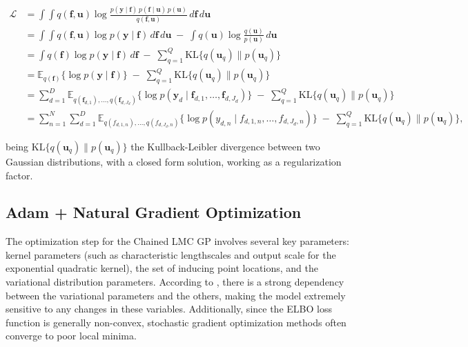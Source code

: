 \begin{equation}
	\begin{split}
		\mathcal{L}
		&= \int\!\!\int q(\boldsymbol{f},\boldsymbol{u})
		\log \frac{p(\boldsymbol{y}\mid\boldsymbol{f})\,
			p(\boldsymbol{f}\mid\boldsymbol{u})\,
			p(\boldsymbol{u})}
		{q(\boldsymbol{f},\boldsymbol{u})}
		\,d\boldsymbol{f}\,d\boldsymbol{u}
		\\
		&= \int\!\!\int q(\boldsymbol{f},\boldsymbol{u})
		\log p(\boldsymbol{y}\mid\boldsymbol{f})
		\,d\boldsymbol{f}\,d\boldsymbol{u}
		\;-\;
		\int q(\boldsymbol{u})
		\log \frac{q(\boldsymbol{u})}{p(\boldsymbol{u})}
		\,d\boldsymbol{u}
		\\
		&= \int q(\boldsymbol{f})
		\log p(\boldsymbol{y}\mid\boldsymbol{f})
		\,d\boldsymbol{f}
		\;-\;
		\sum_{q=1}^{Q}
		\mathrm{KL}\bigl\{q(\boldsymbol{u}_{q})\parallel p(\boldsymbol{u}_{q})\bigr\}
		\\
		&= \mathbb{E}_{q(\boldsymbol{f})}\bigl\{\log p(\boldsymbol{y}\mid\boldsymbol{f})\bigr\}
		\;-\;
		\sum_{q=1}^{Q}
		\mathrm{KL}\bigl\{q(\boldsymbol{u}_{q})\parallel p(\boldsymbol{u}_{q})\bigr\}
		\\
		&= \sum_{d=1}^{D}
		\mathbb{E}_{q(\boldsymbol{f}_{d,1}),\dots,q(\boldsymbol{f}_{d,J_d})}
		\bigl\{\log p(\boldsymbol{y}_{d}\mid\boldsymbol{f}_{d,1},\dots,\boldsymbol{f}_{d,J_d})\bigr\}
		\;-\;
		\sum_{q=1}^{Q}
		\mathrm{KL}\bigl\{q(\boldsymbol{u}_{q})\parallel p(\boldsymbol{u}_{q})\bigr\}
		\\
		&= \sum_{n=1}^{N}\sum_{d=1}^{D}
		\mathbb{E}_{q(f_{d,1,n}),\dots,q(f_{d,J_d,n})}
		\bigl\{\log p(y_{d,n}\mid f_{d,1,n},\dots,f_{d,J_d,n})\bigr\}
		\;-\;
		\sum_{q=1}^{Q}
		\mathrm{KL}\bigl\{q(\boldsymbol{u}_{q})\parallel p(\boldsymbol{u}_{q})\bigr\},
	\end{split}
\end{equation}

being \( \text{KL}\{q(\boldsymbol{u}_q)\parallel p(\boldsymbol{u}_q)\} \) the Kullback-Leibler divergence between two Gaussian distributions, with a closed form solution, working as a regularization factor.

\subsection{Adam + Natural Gradient Optimization}

The optimization step for the Chained LMC GP involves several key parameters: kernel parameters (such as characteristic lengthscales and output scale for the exponential quadratic kernel), the set of inducing point locations, and the variational distribution parameters. According to \cite{giraldo2021fully}, there is a strong dependency between the variational parameters and the others, making the model extremely sensitive to any changes in these variables. Additionally, since the ELBO loss function is generally non-convex, stochastic gradient optimization methods often converge to poor local minima.

